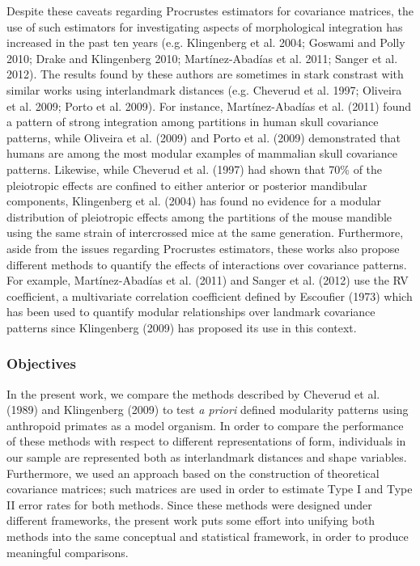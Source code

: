 \documentclass[12pt,]{article}
\begin{document}
Despite these caveats regarding Procrustes estimators for covariance
matrices, the use of such estimators for investigating aspects of
morphological integration has increased in the past ten years (e.g.
Klingenberg et al. 2004; Goswami and Polly 2010; Drake and Klingenberg
2010; Martínez-Abadías et al. 2011; Sanger et al. 2012). The results
found by these authors are sometimes in stark constrast with similar
works using interlandmark distances (e.g. Cheverud et al. 1997; Oliveira
et al. 2009; Porto et al. 2009). For instance, Martínez-Abadías et al.
(2011) found a pattern of strong integration among partitions in human
skull covariance patterns, while Oliveira et al. (2009) and Porto et al.
(2009) demonstrated that humans are among the most modular examples of
mammalian skull covariance patterns. Likewise, while Cheverud et al.
(1997) had shown that 70\% of the pleiotropic effects are confined to
either anterior or posterior mandibular components, Klingenberg et al.
(2004) has found no evidence for a modular distribution of pleiotropic
effects among the partitions of the mouse mandible using the same strain
of intercrossed mice at the same generation. Furthermore, aside from the
issues regarding Procrustes estimators, these works also propose
different methods to quantify the effects of interactions over
covariance patterns. For example, Martínez-Abadías et al. (2011) and
Sanger et al. (2012) use the RV coefficient, a multivariate correlation
coefficient defined by Escoufier (1973) which has been used to quantify
modular relationships over landmark covariance patterns since
Klingenberg (2009) has proposed its use in this context.

\subsubsection{Objectives}\label{objectives}

In the present work, we compare the methods described by Cheverud et al.
(1989) and Klingenberg (2009) to test \emph{a priori} defined modularity
patterns using anthropoid primates as a model organism. In order to
compare the performance of these methods with respect to different
representations of form, individuals in our sample are represented both
as interlandmark distances and shape variables. Furthermore, we used an
approach based on the construction of theoretical covariance matrices;
such matrices are used in order to estimate Type I and Type II error
rates for both methods. Since these methods were designed under
different frameworks, the present work puts some effort into unifying
both methods into the same conceptual and statistical framework, in
order to produce meaningful comparisons.
\end{document}

